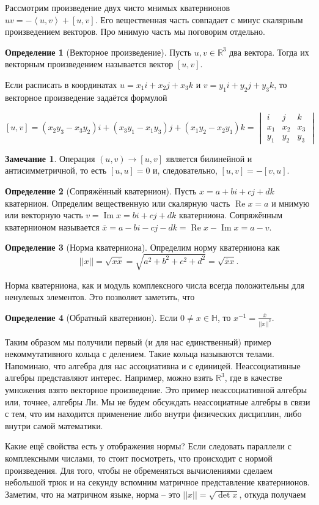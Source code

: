 \documentclass[10pt,a4paper,oneside]{book}
\theoremstyle{definition}
\newtheorem*{rem}{Замечание}
\newtheorem*{defn}{{\color{yellow!20!red} Определение}}
\renewcommand{\Re}{\operatorname{Re}}
\newcommand{\mb}[1]{\mathbb{#1}}
\newcommand{\ovl}{\overline}
\renewcommand{\Im}{\operatorname{Im}}
\def\lan{\left\langle }
\def\ran{\right\rangle}
\def\dfn{\begin{defn}}
\def\edfn{\end{defn}}
\def\rm{\begin{rem}}
\def\erm{\end{rem}}
\begin{document}
Рассмотрим произведение двух чисто мнимых кватернионов $uv=-\lan u,v\ran+[u,v]$. Его вещественная часть совпадает с минус скалярным произведением векторов. Про мнимую часть мы поговорим отдельно.

\dfn[Векторное произведение] Пусть $u,v \in \mb R^3$ два вектора. Тогда их векторным произведением называется вектор $[u,v]$.
\edfn

Если расписать в координатах $u=x_1i+x_2j+x_3k$ и  $v=y_1i+y_2j+y_3k$, то векторное произведение задаётся формулой

$$[u,v]= (x_2y_3-x_3y_2)i + (x_3y_1-x_1y_3)j + (x_1y_2- x_2y_1)k= \begin{vmatrix} i& j&k \\ x_1 & x_2 & x_3 \\ y_1 & y_2 & y_3 \end{vmatrix} $$

\rm Операция $(u,v) \to [u,v]$ является билинейной и антисимметричной, то есть $[u,u]=0$ и, следовательно, $[u,v]=-[v,u]$.
\erm


\dfn[Сопряжённый кватернион] Пусть $x= a+bi+cj+dk$ кватернион. Определим вещественную или скалярную часть $\Re x=a$ и мнимую или векторную часть $v=\Im x= bi+cj+dk$ кватерниона. Сопряжённым кватернионом называется $\ovl{x}= a-bi-cj-dk= \Re x - \Im x =a-v$. 
\edfn

\dfn[Норма кватерниона] Определим норму кватерниона как $$||x||=\sqrt{x\ovl{x}}=\sqrt{ a^2+b^2+c^2+d^2}=\sqrt{\ovl{x}x}.$$
\edfn 


Норма кватерниона, как и модуль комплексного числа всегда положительны для ненулевых элементов. Это позволяет заметить, что

\dfn[Обратный кватернион] Если $0\neq x \in \mb H$, то $x^{-1}=\frac{\ovl{x}}{||x||^2}$. 
\edfn

Таким образом мы получили первый (и для нас единственный) пример некоммутативного кольца с делением. Такие кольца называются телами. Напоминаю, что алгебра для нас ассоциативна и с единицей. Неассоциативные алгебры представляют интерес. Например, можно взять $\mb R^3$, где в качестве умножения взято векторное произведение. Это пример неассоциативной алгебры или, точнее, алгебры Ли. Мы не будем обсуждать неассоциатные алгебры в связи с тем, что им находится применение либо внутри физических дисциплин, либо внутри самой математики. 

Какие ещё свойства есть у отображения нормы? Если следовать параллели с комплексными числами, то стоит посмотреть, что происходит с нормой произведения. Для того, чтобы не обременяться вычислениями сделаем небольшой трюк и на секунду вспомним матричное представление кватернионов. Заметим, что на матричном языке, норма -- это $||x||=\sqrt{\det x}$, откуда получаем
\end{document}

